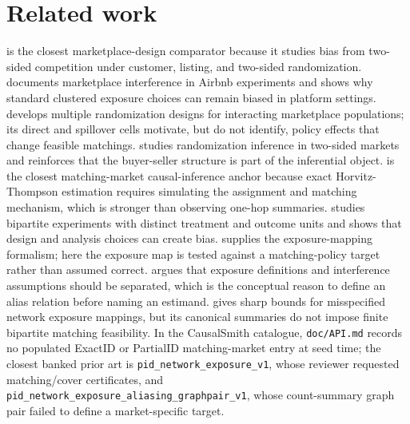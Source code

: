 \documentclass[11pt]{article}
\theoremstyle{definition}
\theoremstyle{plain}
\theoremstyle{remark}
\begin{document}
\section{Related work}
\citet{JohariLiLiskovichWeintraub2022} is the closest marketplace-design comparator because it studies bias from two-sided competition under customer, listing, and two-sided randomization.
\citet{HoltzEtAl2024} documents marketplace interference in Airbnb experiments and shows why standard clustered exposure choices can remain biased in platform settings.
\citet{MasoeroEtAl2026} develops multiple randomization designs for interacting marketplace populations; its direct and spillover cells motivate, but do not identify, policy effects that change feasible matchings.
\citet{LiuShaikhToulis2025} studies randomization inference in two-sided markets and reinforces that the buyer-seller structure is part of the inferential object.
\citet{Chen2019} is the closest matching-market causal-inference anchor because exact Horvitz-Thompson estimation requires simulating the assignment and matching mechanism, which is stronger than observing one-hop summaries.
\citet{DoudchenkoEtAl2020} studies bipartite experiments with distinct treatment and outcome units and shows that design and analysis choices can create bias.
\citet{AronowSamii2017} supplies the exposure-mapping formalism; here the exposure map is tested against a matching-policy target rather than assumed correct.
\citet{Savje2024} argues that exposure definitions and interference assumptions should be separated, which is the conceptual reason to define an alias relation before naming an estimand.
\citet{SchroderEtAl2026} gives sharp bounds for misspecified network exposure mappings, but its canonical summaries do not impose finite bipartite matching feasibility.
In the CausalSmith catalogue, \texttt{doc/API.md} records no populated ExactID or PartialID matching-market entry at seed time; the closest banked prior art is \texttt{pid\_network\_exposure\_v1}, whose reviewer requested matching/cover certificates, and \texttt{pid\_network\_exposure\_aliasing\_graphpair\_v1}, whose count-summary graph pair failed to define a market-specific target.
\end{document}
